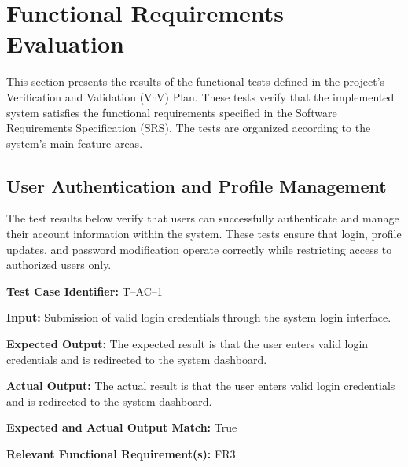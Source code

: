 \documentclass[12pt, titlepage]{article}
\begin{document}
\section{Functional Requirements Evaluation}
\hspace{2em}This section presents the results of the functional tests defined in the project's
Verification and Validation (VnV) Plan. These tests verify that the implemented system
satisfies the functional requirements specified in the Software Requirements Specification
(SRS). The tests are organized according to the system's main feature areas.

\subsection{User Authentication and Profile Management}
\hspace{2em}The test results below verify that users can successfully authenticate
and manage their account information within the system. These tests ensure that
login, profile updates, and password modification operate correctly while
restricting access to authorized users only.


\begin{mdframed}[linewidth=0.5mm]
\setlength{\parindent}{0pt}
\textbf{Test Case Identifier:} T--AC--1
\vspace{0.4em}

\textbf{Input:} Submission of valid login credentials through the system login interface.
\vspace{0.4em}

\textbf{Expected Output:} The expected result is that the user enters valid login credentials and is redirected to the system dashboard.
\vspace{0.4em}

\textbf{Actual Output:} The actual result is that the user enters valid login credentials and is redirected to the system dashboard.
\vspace{0.4em}

\textbf{Expected and Actual Output Match:} True
\vspace{0.4em}

\textbf{Relevant Functional Requirement(s):}  FR3
\end{mdframed}
\end{document}
